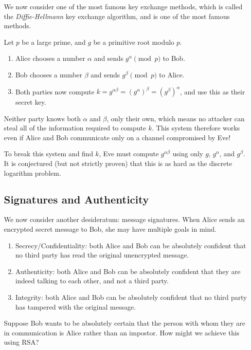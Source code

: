 \documentclass{article}
\begin{document}
We now consider one of the most famous key exchange methods, which is called the \textit{Diffie-Hellmann} key exchange algorithm, and is one of the most famous methods.

Let $p$ be a large prime, and $g$ be a primitive root modulo $p$.
\begin{enumerate}
    \item Alice chooses a number $\alpha$ and sends $g^\alpha \pmod p$ to Bob.
    \item Bob chooses a number $\beta$ and sends $g^\beta \pmod p$ to Alice.
    \item Both parties now compute $k = g^{\alpha\beta} = (g^\alpha)^\beta = (g^\beta)^\alpha$, and use this as their secret key.
\end{enumerate}
Neither party knows both $\alpha$ and $\beta$, only their own, which means no attacker can steal all of the information required to compute $k$. This system therefore works even if Alice and Bob communicate only on a channel compromised by Eve!

To break this system and find $k$, Eve must compute $g^{\alpha\beta}$ using only $g$, $g^\alpha$, and $g^\beta$. It is conjectured (but not strictly proven) that this is as hard as the discrete logarithm problem.


\subsection{Signatures and Authenticity}

We now consider another desideratum: message signatures. When Alice sends an encrypted secret message to Bob, she may have multiple goals in mind.

\begin{enumerate}
    \item Secrecy/Confidentiality: both Alice and Bob can be absolutely confident that no third party has read the original unencrypted message.
    \item Authenticity: both Alice and Bob can be absolutely confident that they are indeed talking to each other, and not a third party.
    \item Integrity: both Alice and Bob can be absolutely confident that no third party has tampered with the original message.
\end{enumerate}

Suppose Bob wants to be absolutely certain that the person with whom they are in communication is Alice rather than an impostor. How might we achieve this using RSA?
\end{document}
